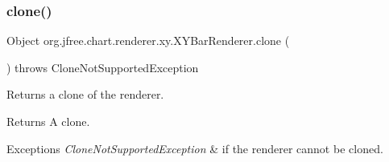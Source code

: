 \subsubsection{\texorpdfstring{clone()}{clone()}}
{\footnotesize\ttfamily Object org.\+jfree.\+chart.\+renderer.\+xy.\+X\+Y\+Bar\+Renderer.\+clone (\begin{DoxyParamCaption}{ }\end{DoxyParamCaption}) throws Clone\+Not\+Supported\+Exception}

Returns a clone of the renderer.

\begin{DoxyReturn}{Returns}
A clone.
\end{DoxyReturn}

\begin{DoxyExceptions}{Exceptions}
{\em Clone\+Not\+Supported\+Exception} & if the renderer cannot be cloned. \\
\hline
\end{DoxyExceptions}
\mbox{\label{classorg_1_1jfree_1_1chart_1_1renderer_1_1xy_1_1_x_y_bar_renderer_a3a32231ead2940a192d7966cd06e4a97}} 
